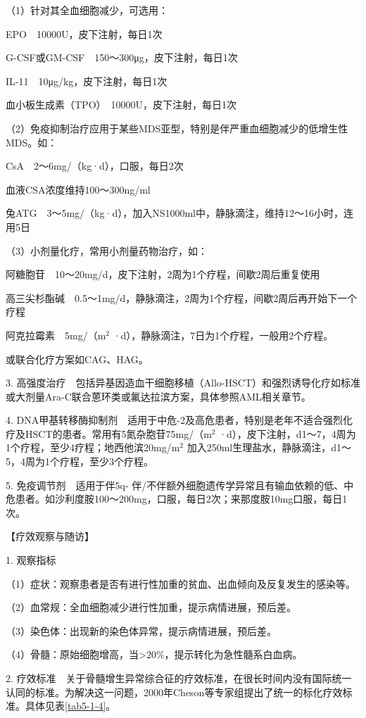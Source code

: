 （1）针对其全血细胞减少，可选用：

EPO　10000U，皮下注射，每日1次

G-CSF或GM-CSF　150～300μg，皮下注射，每日1次

IL-11　10μg/kg，皮下注射，每日1次

血小板生成素（TPO）　10000U，皮下注射，每日1次

（2）免疫抑制治疗应用于某些MDS亚型，特别是伴严重血细胞减少的低增生性MDS。如：

CsA　2～6mg/（kg·d），口服，每日2次

血液CSA浓度维持100～300ng/ml

兔ATG　3～5mg/（kg·d），加入NS1000ml中，静脉滴注，维持12～16小时，连用5日

（3）小剂量化疗，常用小剂量药物治疗，如：

阿糖胞苷　10～20mg/d，皮下注射，2周为1个疗程，间歇2周后重复使用

高三尖杉酯碱　0.5～1mg/d，静脉滴注，2周为1个疗程，间歇2周后再开始下一个疗程

阿克拉霉素　5mg/（m$^2$ ·d），静脉滴注，7日为1个疗程，一般用2个疗程。

或联合化疗方案如CAG、HAG。

3.
高强度治疗　包括异基因造血干细胞移植（Allo-HSCT）和强烈诱导化疗如标准或大剂量Ara-C联合蒽环类或氟达拉滨方案，具体参照AML相关章节。

4.
DNA甲基转移酶抑制剂　适用于中危-2及高危患者，特别是老年不适合强烈化疗及HSCT的患者。常用有5氮杂胞苷75mg/（m$^2$
·d），皮下注射，d1～7，4周为1个疗程，至少4疗程；地西他滨20mg/m$^2$
加入250ml生理盐水，静脉滴注，d1～5，4周为1个疗程，至少3个疗程。

5. 免疫调节剂　适用于伴5q{-}
伴/不伴额外细胞遗传学异常且有输血依赖的低、中危患者。如沙利度胺100～200mg，口服，每日2次；来那度胺10mg口服，每日1次。

【疗效观察与随访】

1. 观察指标

（1）症状：观察患者是否有进行性加重的贫血、出血倾向及反复发生的感染等。

（2）血常规：全血细胞减少进行性加重，提示病情进展，预后差。

（3）染色体：出现新的染色体异常，提示病情进展，预后差。

（4）骨髓：原始细胞增高，当\textgreater{}20\%，提示转化为急性髓系白血病。

2.
疗效标准　关于骨髓增生异常综合征的疗效标准，在很长时间内没有国际统一认同的标准。为解决这一问题，2000年Cheson等专家组提出了统一的标化疗效标准。具体见表\ref{tab5-1-4}。

